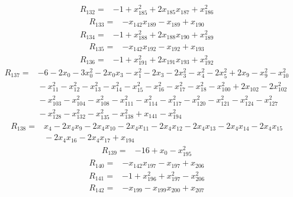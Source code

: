 \begin{align*}
R_{132}={}& -1 + x_{185}^{2} + 2x_{185}x_{187} + x_{186}^{2}
\end{align*}
\begin{align*}
R_{133}={}& -x_{142}x_{189} - x_{189} + x_{190}
\end{align*}
\begin{align*}
R_{134}={}& -1 + x_{188}^{2} + 2x_{188}x_{190} + x_{189}^{2}
\end{align*}
\begin{align*}
R_{135}={}& -x_{142}x_{192} - x_{192} + x_{193}
\end{align*}
\begin{align*}
R_{136}={}& -1 + x_{191}^{2} + 2x_{191}x_{193} + x_{192}^{2}
\end{align*}
\begin{align*}
R_{137}={}& -6 - 2x_{0} - 3x_{0}^{2} - 2x_{0}x_{3} - x_{1}^{2} - 2x_{3} - 2x_{3}^{2} - x_{4}^{2} - 2x_{5}^{2} + 2x_{9} - x_{9}^{2} - x_{10}^{2} \\
&{} - x_{11}^{2} - x_{12}^{2} - x_{13}^{2} - x_{14}^{2} - x_{15}^{2} - x_{16}^{2} - x_{17}^{2} - x_{18}^{2} - x_{100}^{2} + 2x_{102} - 2x_{102}^{2} \\
&{} - x_{103}^{2} - x_{104}^{2} - x_{108}^{2} - x_{111}^{2} - x_{114}^{2} - x_{117}^{2} - x_{120}^{2} - x_{121}^{2} - x_{124}^{2} - x_{127}^{2} \\
&{} - x_{128}^{2} - x_{132}^{2} - x_{135}^{2} - x_{138}^{2} + x_{141} - x_{194}^{2}
\end{align*}
\begin{align*}
R_{138}={}& x_{4} - 2x_{4}x_{9} - 2x_{4}x_{10} - 2x_{4}x_{11} - 2x_{4}x_{12} - 2x_{4}x_{13} - 2x_{4}x_{14} - 2x_{4}x_{15} \\
&{} - 2x_{4}x_{16} - 2x_{4}x_{17} + x_{194}
\end{align*}
\begin{align*}
R_{139}={}& -16 + x_{0} - x_{195}^{2}
\end{align*}
\begin{align*}
R_{140}={}& -x_{142}x_{197} - x_{197} + x_{206}
\end{align*}
\begin{align*}
R_{141}={}& -1 + x_{196}^{2} + x_{197}^{2} - x_{206}^{2}
\end{align*}
\begin{align*}
R_{142}={}& -x_{199} - x_{199}x_{200} + x_{207}
\end{align*}
